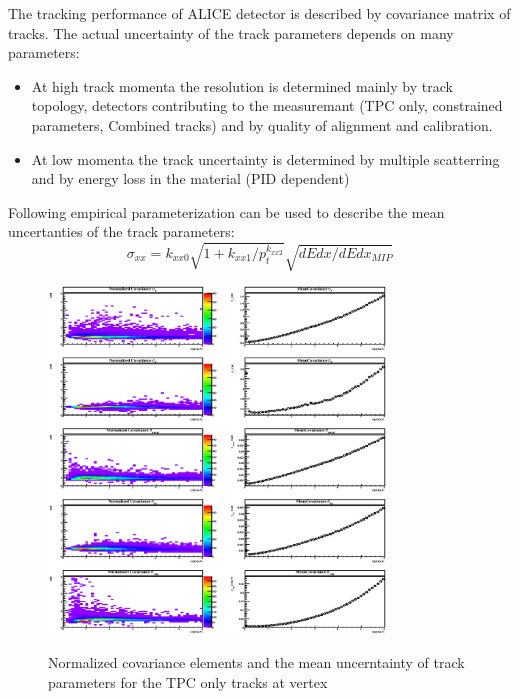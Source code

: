 \documentclass[12pt]{article}
\begin{document}
The tracking performance of ALICE detector is described by   covariance matrix of tracks. The actual uncertainty of the track parameters depends on many parameters:
\begin{itemize}
\item At high track momenta the resolution is determined mainly by track topology, detectors contributing to the measuremant (TPC only, constrained parameters, Combined tracks) and by quality of alignment and calibration.
\item At low momenta the track uncertainty is determined by multiple scatterring and by energy loss in the material (PID dependent)    
\end{itemize}

Following empirical  parameterization can be used to describe the mean uncertanties of the track parameters:
\begin{equation}
 \sigma_{xx}=k_{xx0}\sqrt{1+k_{xx1}/p_{t}^{k_{xx2}}}\sqrt{dEdx/dEdx_{MIP}}
 \label{eq.:TrackResol}
\end{equation}


\begin{figure}[htbp]
\begin{center}
\includegraphics[width=0.8\textwidth]{figures/covarScaledTPC.eps}
\label{fig_CovarTPC}
\end{center}
\caption{Normalized covariance elements and the mean uncerntainty of track parameters for the TPC only tracks at vertex}
\end{figure}
\end{document}
